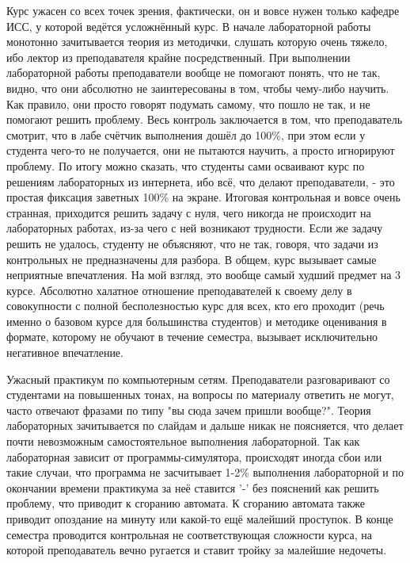             \begin{commentbox} 
                Курс ужасен со всех точек зрения, фактически, он и вовсе нужен только кафедре ИСС, у которой ведётся усложнённый курс. В начале лабораторной работы монотонно зачитывается теория из методички, слушать которую очень тяжело, ибо лектор из преподавателя крайне посредственный. При выполнении лабораторной работы преподаватели вообще не помогают понять, что не так, видно, что они абсолютно не заинтересованы в том, чтобы чему-либо научить. Как правило, они просто говорят подумать самому, что пошло не так, и не помогают решить проблему. Весь контроль заключается в том, что преподаватель смотрит, что в лабе счётчик выполнения дошёл до 100\%, при этом если у студента чего-то не получается, они не пытаются научить, а просто игнорируют проблему. По итогу можно сказать, что студенты сами осваивают курс по решениям лабораторных из интернета, ибо всё, что делают преподаватели, - это простая фиксация заветных 100\% на экране. Итоговая контрольная и вовсе очень странная, приходится решить задачу с нуля, чего никогда не происходит на лабораторных работах, из-за чего с ней возникают трудности. Если же задачу решить не удалось, студенту не объясняют, что не так, говоря, что задачи из контрольных не предназначены для разбора. В общем, курс вызывает самые неприятные впечатления. На мой взгляд, это вообще самый худший предмет на 3 курсе. Абсолютно халатное отношение преподавателей к своему делу в совокупности с полной бесполезностью курс для всех, кто его проходит (речь именно о базовом курсе для большинства студентов) и методике оценивания в формате, которому не обучают в течение семестра, вызывает исключительно негативное впечатление.  
            \end{commentbox} 
        
            \begin{commentbox} 
                Ужасный практикум по компьютерным сетям. Преподаватели разговаривают со студентами на повышенных тонах, на вопросы по материалу ответить не могут, часто отвечают фразами по типу "вы сюда зачем пришли вообще?". Теория лабораторных зачитывается по слайдам и дальше никак не поясняется, что делает почти невозможным самостоятельное выполнения лабораторной. Так как лабораторная зависит от программы-симулятора, происходят иногда сбои или такие случаи, что программа не засчитывает 1-2\% выполнения лабораторной и по окончании времени практикума за неё ставится '-' без пояснений как решить проблему, что приводит к сгоранию автомата. К сгоранию автомата также приводит опоздание на минуту или какой-то ещё малейший проступок. В конце семестра проводится контрольная не соответствующая сложности курса, на которой преподаватель вечно ругается и ставит тройку за малейшие недочеты. 
            \end{commentbox} 
        
